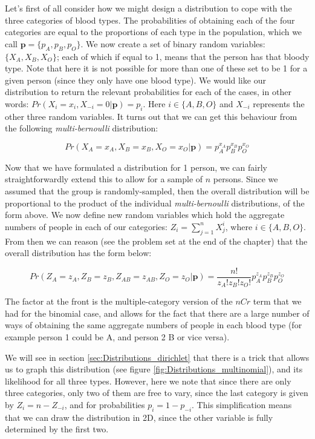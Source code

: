 \documentclass[11pt,fullpage]{book}
\begin{document}
Let's first of all consider how we might design a distribution to cope with the three categories of blood types. The probabilities of obtaining each of the four categories are equal to the proportions of each type in the population, which we call $\boldsymbol{p}=\{p_A,p_B,p_O\}$. We now create a set of binary random variables: $\{X_A,X_B,X_O\}$; each of which if equal to 1, means that the person has that bloody type. Note that here it is not possible for more than one of these set to be 1 for a given person (since they only have one blood type). We would like our distribution to return the relevant probabilities for each of the cases, in other words: $Pr(X_i=x_i,X_{-i}=0|\boldsymbol{p}) = p_i$. Here $i\in\{A,B,O\}$ and $X_{-i}$ represents the other three random variables. It turns out that we can get this behaviour from the following \textit{multi-bernoulli} distribution:

\begin{equation}
Pr(X_A=x_A,X_B=x_B,X_O=x_O|\boldsymbol{p}) = p_A^{x_A} p_B^{x_B} p_O^{x_O}
\end{equation}

Now that we have formulated a distribution for 1 person, we can fairly straightforwardly extend this to allow for a sample of $n$ persons. Since we assumed that the group is randomly-sampled, then the overall distribution will be proportional to the product of the individual \textit{multi-bernoulli} distributions, of the form above. We now define new random variables which hold the aggregate numbers of people in each of our categories: $Z_i=\sum\limits_{j=1}^{n}X_j^i$, where $i\in\{A,B,O\}$. From then we can reason (see the problem set at the end of the chapter) that the overall distribution has the form below:



\begin{equation}
Pr(Z_A=z_A,Z_B=z_B,Z_{AB}=z_{AB},Z_{O}=z_O|\boldsymbol{p}) = \frac{n!}{z_A!z_B!z_O!} p_A^{z_A} p_B^{z_B}  p_O^{z_O}
\end{equation}

The factor at the front is the multiple-category version of the $nCr$ term that we had for the binomial case, and allows for the fact that there are a large number of ways of obtaining the same aggregate numbers of people in each blood type (for example person 1 could be A, and person 2 B or vice versa).

We will see in section \ref{sec:Distributions_dirichlet} that there is a trick that allows us to graph this distribution (see figure \ref{fig:Distributions_multinomial}), and its likelihood for all three types. However, here we note that since there are only three categories, only two of them are free to vary, since the last category is given by $Z_i = n - Z_{-i}$, and for probabilities $p_i = 1 - p_{-i}$. This simplification means that we can draw the distribution in 2D, since the other variable is fully determined by the first two.
\end{document}
